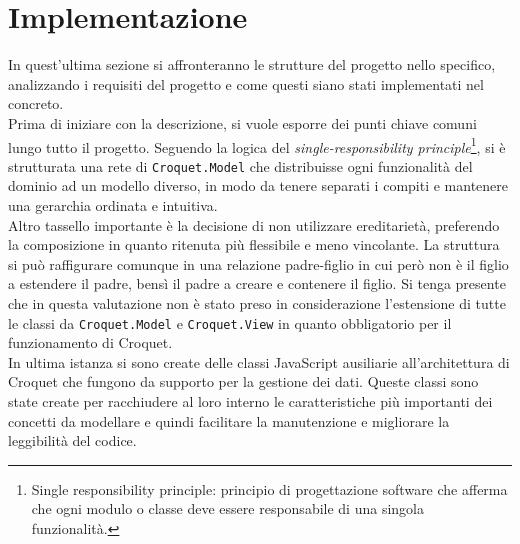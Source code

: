 \section{Implementazione}\label{sec:progettazione}
In quest'ultima sezione si affronteranno le strutture del progetto nello specifico, analizzando i requisiti del progetto e come questi siano stati implementati nel concreto.\\
\newline
Prima di iniziare con la descrizione, si vuole esporre dei punti chiave comuni lungo tutto il progetto. Seguendo la logica del \textit{single-responsibility principle}\footnote{
    Single responsibility principle: principio di progettazione software che afferma che ogni modulo o classe deve essere responsabile di una singola funzionalità.
}, si è strutturata una rete di \texttt{Croquet.Model} che distribuisse ogni funzionalità del dominio ad un modello diverso, in modo da 
tenere separati i compiti e mantenere una gerarchia ordinata e intuitiva.\\
Altro tassello importante è la decisione di non utilizzare ereditarietà, preferendo la composizione in quanto ritenuta più flessibile e meno vincolante. La struttura si può
raffigurare comunque in una relazione padre-figlio in cui però non è il figlio a estendere il padre, bensì il padre a creare e contenere il figlio. Si tenga presente che in questa
valutazione non è stato preso in considerazione l'estensione di tutte le classi da \texttt{Croquet.Model} e \texttt{Croquet.View} in quanto obbligatorio per il funzionamento di Croquet.\\
In ultima istanza si sono create delle classi JavaScript ausiliarie all'architettura di Croquet che fungono da supporto per la gestione dei dati. Queste classi sono state create per 
racchiudere al loro interno le caratteristiche più importanti dei concetti da modellare e quindi facilitare la manutenzione e migliorare la leggibilità del codice.\\

